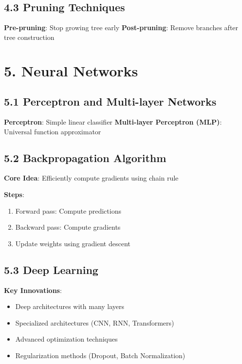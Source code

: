 \documentclass{amsart}
\theoremstyle{plain}
\theoremstyle{definition}
\theoremstyle{remark}
\begin{document}
\subsection{4.3 Pruning Techniques}

\textbf{Pre-pruning}: Stop growing tree early
\textbf{Post-pruning}: Remove branches after tree construction

\section{5. Neural Networks}

\subsection{5.1 Perceptron and Multi-layer Networks}

\textbf{Perceptron}: Simple linear classifier
\textbf{Multi-layer Perceptron (MLP)}: Universal function approximator

\subsection{5.2 Backpropagation Algorithm}

\textbf{Core Idea}: Efficiently compute gradients using chain rule

\textbf{Steps}:

\begin{enumerate}
	\item Forward pass: Compute predictions
	\item Backward pass: Compute gradients
	\item Update weights using gradient descent
\end{enumerate}

\subsection{5.3 Deep Learning}

\textbf{Key Innovations}:

\begin{itemize}
	\item Deep architectures with many layers
	\item Specialized architectures (CNN, RNN, Transformers)
	\item Advanced optimization techniques
	\item Regularization methods (Dropout, Batch Normalization)
\end{itemize}
\end{document}
